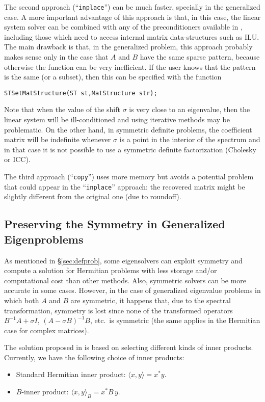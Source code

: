 	The second approach (``\Verb!inplace!'') can be much faster, specially in the generalized case. A more important advantage of this approach is that, in this case, the linear system solver can be combined with any of the preconditioners available in \petsc, including those which need to access internal matrix data-structures such as ILU. The main drawback is that, in the generalized problem, this approach probably makes sense only in the case that $A$ and $B$ have the same sparse pattern, because otherwise the function  can be very inefficient. 
If the user knows that the pattern is the same (or a subset), then this can be specified with the function
	\begin{Verbatim}[fontsize=\small]
	STSetMatStructure(ST st,MatStructure str);
	\end{Verbatim}
	
	Note that when the value of the shift $\sigma$ is very close to an eigenvalue, then the linear system will be ill-conditioned and using iterative methods may be problematic. On the other hand, in symmetric definite problems, the coefficient matrix will be indefinite whenever $\sigma$ is a point in the interior of the spectrum and in that case it is not possible to use a symmetric definite factorization (Cholesky or ICC).

	The third approach (``\Verb!copy!'') uses more memory but avoids a potential problem that could appear in the ``\Verb!inplace!'' approach: the recovered matrix might be slightly different from the original one (due to roundoff).

\subsection{Preserving the Symmetry in Generalized Eigenproblems}
\label{sec:symm}

	As mentioned in \S\ref{sec:defprob}, some eigensolvers can exploit symmetry and compute a solution for Hermitian problems with less storage and/or computational cost than other methods. Also, symmetric solvers can be more accurate in some cases. However, in the case of generalized eigenvalue problems in which both $A$ and $B$ are symmetric, it happens that, due to the spectral transformation, symmetry is lost since none of the transformed operators $B^{-1}\!A+\sigma I$, $(A-\sigma B)^{-1}B$, etc.\ is symmetric (the same applies in the Hermitian case for complex matrices).

	The solution proposed in \slepc is based on selecting different kinds of inner products. Currently, we have the following choice of inner products:
  \begin{itemize}
    \item Standard Hermitian inner product: $\langle x,y\rangle=x^*y$.
    \item $B$-inner product: $\langle x,y\rangle_B=x^*\!B\,y$.
  \end{itemize}


